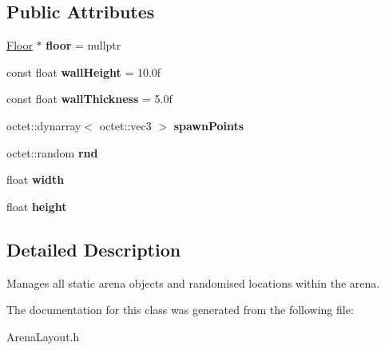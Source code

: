 \subsection*{Public Attributes}
\begin{DoxyCompactItemize}
\item 
\hypertarget{class_arena_1_1_arena_layout_aa49c66cee438ffafe7faf305881e03f5}{\hyperlink{class_arena_1_1_floor}{Floor} $\ast$ {\bfseries floor} = nullptr}\label{class_arena_1_1_arena_layout_aa49c66cee438ffafe7faf305881e03f5}

\item 
\hypertarget{class_arena_1_1_arena_layout_a0509503437cfceb1cb9d790120deb543}{const float {\bfseries wall\+Height} = 10.\+0f}\label{class_arena_1_1_arena_layout_a0509503437cfceb1cb9d790120deb543}

\item 
\hypertarget{class_arena_1_1_arena_layout_a992a2571751a9ac15fef8c0ce35238e4}{const float {\bfseries wall\+Thickness} = 5.\+0f}\label{class_arena_1_1_arena_layout_a992a2571751a9ac15fef8c0ce35238e4}

\item 
\hypertarget{class_arena_1_1_arena_layout_ac583a8ac41bc5478c1ca78139595fd07}{octet\+::dynarray$<$ octet\+::vec3 $>$ {\bfseries spawn\+Points}}\label{class_arena_1_1_arena_layout_ac583a8ac41bc5478c1ca78139595fd07}

\item 
\hypertarget{class_arena_1_1_arena_layout_a3070a129044e033eaa3d57691e36a0d8}{octet\+::random {\bfseries rnd}}\label{class_arena_1_1_arena_layout_a3070a129044e033eaa3d57691e36a0d8}

\item 
\hypertarget{class_arena_1_1_arena_layout_a3c1d6c20432a09b05eea93a50c304dc1}{float {\bfseries width}}\label{class_arena_1_1_arena_layout_a3c1d6c20432a09b05eea93a50c304dc1}

\item 
\hypertarget{class_arena_1_1_arena_layout_ae156f858dc91474473461417e6cb0d27}{float {\bfseries height}}\label{class_arena_1_1_arena_layout_ae156f858dc91474473461417e6cb0d27}

\end{DoxyCompactItemize}


\subsection{Detailed Description}
Manages all static arena objects and randomised locations within the arena. 

The documentation for this class was generated from the following file\+:\begin{DoxyCompactItemize}
\item 
Arena\+Layout.\+h\end{DoxyCompactItemize}
